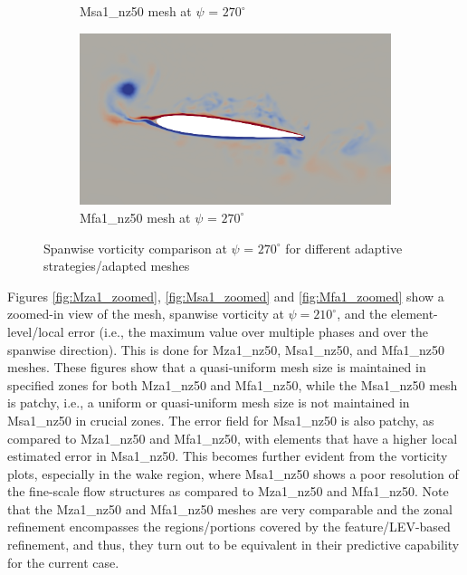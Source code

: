 \begin{figure}[H]
\begin{subfigure}[b]{0.475\textwidth}
\caption{Msa1\_nz50 mesh at $\psi$ = $270^\circ$}
\label{fig:hadapt_psi270}
\end{subfigure}
\begin{subfigure}[b]{0.475\textwidth}
\centering
\includegraphics[width=1\textwidth]{figures/adapt_strat/vorticity_plots/Mfa1_50/phase_270.png}
\caption{Mfa1\_nz50 mesh at $\psi$ = $270^\circ$}
\label{fig:FB_psi270}
\end{subfigure}
\caption{Spanwise vorticity comparison at $\psi$ = $270^\circ$ for different adaptive strategies/adapted meshes}
\label{fig:vorticity_270}
\end{figure}

Figures \ref{fig:Mza1_zoomed}, \ref{fig:Msa1_zoomed} and \ref{fig:Mfa1_zoomed} show a zoomed-in view of the mesh, spanwise vorticity at $\psi=210^\circ$, and the element-level/local error (i.e., the maximum value over multiple phases and over the spanwise direction). This is done for Mza1\_nz50, Msa1\_nz50, and Mfa1\_nz50 meshes.
These figures show that a quasi-uniform mesh size is maintained in specified zones for both Mza1\_nz50 and Mfa1\_nz50, while the Msa1\_nz50 mesh is patchy, i.e., a uniform or quasi-uniform mesh size is not maintained in Msa1\_nz50 in crucial zones.
The error field for Msa1\_nz50 is also patchy, as compared to Mza1\_nz50 and Mfa1\_nz50, with elements that have a higher local estimated error in Msa1\_nz50.
This becomes further evident from the vorticity plots, especially in the wake region, where Msa1\_nz50 shows a poor resolution of the fine-scale flow structures as compared to Mza1\_nz50 and Mfa1\_nz50.
Note that the Mza1\_nz50 and Mfa1\_nz50 meshes are very comparable and the zonal refinement encompasses the regions/portions covered by the feature/LEV-based refinement, and thus, they turn out to be equivalent in their predictive capability for the current case.

